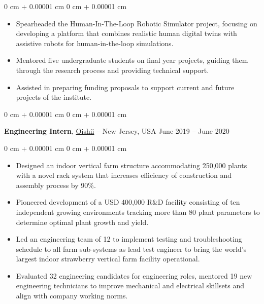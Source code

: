 \documentclass[10pt, letterpaper]{article}
\newenvironment{highlights}{
    \begin{itemize}[
        topsep=0.10 cm,
        parsep=0.10 cm,
        partopsep=0pt,
        itemsep=0pt,
        leftmargin=0 cm + 10pt
    ]
}{
    \end{itemize}
} %
\newenvironment{onecolentry}{
    \begin{adjustwidth}{
        0 cm + 0.00001 cm
    }{
        0 cm + 0.00001 cm
    }
}{
    \end{adjustwidth}
} %
\newenvironment{twocolentry}[2][]{
    \onecolentry
    \def\secondColumn{#2}
    \setcolumnwidth{\fill, 4.5 cm}
    \begin{paracol}{2}
}{
    \switchcolumn \raggedleft \secondColumn
    \end{paracol}
    \endonecolentry
} %
\begin{document}
        \vspace{0.10 cm}
        \begin{onecolentry}
            \begin{highlights}
                \item Spearheaded the Human-In-The-Loop Robotic Simulator project, focusing on developing a platform that combines realistic human digital twins with assistive robots for human-in-the-loop simulations.
                \item Mentored five undergraduate students on final year projects, guiding them through the research process and providing technical support.
                \item Assisted in preparing funding proposals to support current and future projects of the institute.
            \end{highlights}
        \end{onecolentry}


        \vspace{0.2 cm}

        \begin{twocolentry}{
            June 2019 – June 2020
        }
            \textbf{Engineering Intern}, \href{https://oishii.com/}{Oishii} -- New Jersey, USA\end{twocolentry}

        \vspace{0.10 cm}
        \begin{onecolentry}
            \begin{highlights}
                \item Designed an indoor vertical farm structure accommodating 250,000 plants with a novel rack system that increases efficiency of construction and assembly process by 90\%.
                \item Pioneered development of a USD 400,000 R\&D facility consisting of ten independent growing environments tracking more than 80 plant parameters to determine optimal plant growth and yield.
                \item Led an engineering team of 12 to implement testing and troubleshooting schedule to all farm sub-systems as lead test engineer to bring the world’s largest indoor strawberry vertical farm facility operational.
                \item Evaluated 32 engineering candidates for engineering roles, mentored 19 new engineering technicians to improve mechanical and electrical skillsets and align with company working norms.
            \end{highlights}
        \end{onecolentry}
\end{document}
